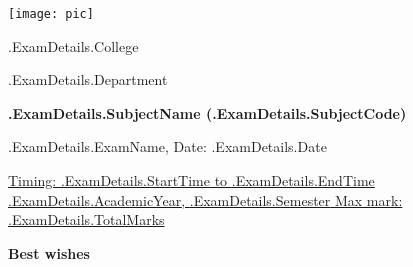 \documentclass[12pt, a4paper]{exam}
\begin{document}
	\noindent
	\begin{minipage}[l]{0.1\textwidth}
		\noindent
		\texttt{[image: pic]}
	\end{minipage}
\hfill
\begin{minipage}[c]{0.8\textwidth}
	\begin{center}
		{\large	{{.ExamDetails.College}} \par
		\large	{{.ExamDetails.Department}}	\par
	\large \textbf{ {{.ExamDetails.SubjectName}} ({{.ExamDetails.SubjectCode}})}	\par
\small	{{.ExamDetails.ExamName}}, Date: {{.ExamDetails.Date}}}
	\end{center}
\end{minipage}
\par
\vspace{0.2in}
\noindent
\uline{Timing: {{.ExamDetails.StartTime}} to {{.ExamDetails.EndTime}}	\hfill {{.ExamDetails.AcademicYear}}, {{.ExamDetails.Semester}}		\hfill Max mark: {{.ExamDetails.TotalMarks}}}
\par 
\vspace{0.15in}

\vspace{0.75in}
{\large \bfseries Best wishes}
\end{document}
